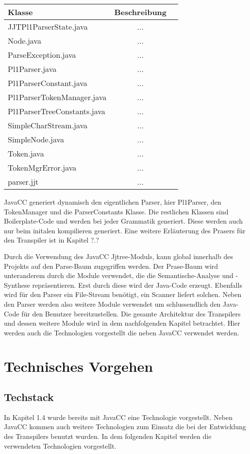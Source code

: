 \begin{tabular}[h]{l|c|r}
Klasse & Beschreibung \\
\hline
JJTPl1ParserState.java & ... \\
Node.java & ... \\
ParseException.java & ... \\
Pl1Parser.java & ... \\
Pl1ParserConstant.java & ... \\
Pl1ParserTokenManager.java & ... \\
Pl1ParserTreeConstants.java & ... \\
SimpleCharStream.java & ... \\
SimpleNode.java & ... \\
Token.java & ... \\
TokenMgrError.java & ... \\
parser.jjt & ... \\
\end{tabular}


JavaCC generiert dynamisch den eigentlichen Parser, hier Pl1Parser, den TokenManager und die ParserConstants Klasse. Die restlichen Klassen sind Boilerplate-Code und werden bei jeder Grammatik generiert. Diese werden auch nur beim initalen kompilieren generiert. Eine weitere Erläuterung des Prasers für den Transpiler ist in Kapitel ?.?

Durch die Verwendung des JavaCC Jjtree-Moduls, kann global innerhalb des Projekts auf den Parse-Baum zugegriffen werden. 
Der Prase-Baum wird unteranderem durch die Module verwendet, die die Semantische-Analyse und -Synthese repräsentieren.
Erst durch diese wird der Java-Code erzeugt.
Ebenfalls wird für den Parser ein File-Stream benötigt, ein Scanner liefert solchen.
Neben den Parser werden also weitere Module verwendet um schlussendlich den Java-Code für den Benutzer bereitzustellen.
Die gesamte Architektur des Transpilers und dessen weitere Module wird in dem nachfolgenden Kapitel betrachtet. 
Hier werden auch die Technologien vorgestellt die neben JavaCC verwendet werden. 

\section{Technisches Vorgehen}
\subsection{Techstack}
In Kapitel 1.4 wurde bereits mit JavaCC eine Technologie vorgestellt. Neben JavaCC kommen auch weitere Technologien zum Einsatz die bei der Entwicklung des Transpilers benutzt wurden. In dem folgenden Kapitel werden die verwendeten Technologien vorgestellt.


